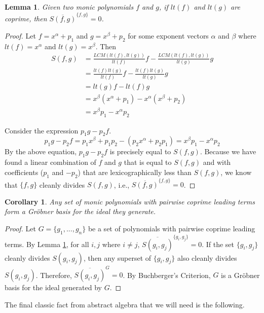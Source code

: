 \documentclass{msthesis}
\newtheorem{lemma}[theorem]{Lemma}
\newtheorem{corollary}[theorem]{Corollary}
\theoremstyle{definition}
\begin{document}
\begin{lemma}\label{lemma:monicS}
    Given two monic polynomials $f$ and $g$, if $lt(f)$ and $lt(g)$ are coprime, then $\overline{S(f,g)}^{\{f,g\}} = 0$.
\end{lemma}
\begin{proof}
    Let $f = x^\alpha + p_1$ and $g = x^\beta + p_2$ for some exponent vectors $\alpha$ and $\beta$ where $lt(f) = x^\alpha$ and $lt(g) = x^\beta$. Then
     \begin{align*}
         S(f,g) &= \frac{LCM(lt(f), lt(g))}{lt(f)}f - \frac{LCM(lt(f), lt(g))}{lt(g)}g\\
         &= \frac{lt(f)lt(g)}{lt(f)}f - \frac{lt(f)lt(g)}{lt(g)}g \\
         &= lt(g)f - lt(f)g \\
         &= x^\beta (x^\alpha + p_1) - x^\alpha (x^\beta + p_2) \\
         &= x^\beta p_1 - x^\alpha p_2
     \end{align*}

     Consider the expression $p_1g - p_2f$.
     \[ p_1g - p_2f = p_1x^\beta + p_1p_2 - (p_2x^\alpha + p_2p_1) = x^\beta p_1 - x^\alpha p_2 \]
     By the above equation, $p_1g - p_2f$ is precisely equal to $S(f, g)$.  Because we have found a linear combination of $f$ and $g$ that is equal to $S(f, g)$ and with coefficients ($p_1$ and $-p_2$) that are lexicographically less than $S(f, g)$, we know that $\{f, g\}$ cleanly divides $S(f, g)$, i.e., $\overline{S(f,g)}^{\{f,g\}} = 0$. 
\end{proof}

\begin{corollary}\label{cor:coprimeGB}
    Any set of monic polynomials with pairwise coprime leading terms form a Gr\"obner basis for the ideal they generate.
\end{corollary}
\begin{proof}
    Let $G=\{g_1, ..., g_n\}$ be a set of polynomials with pairwise coprime leading terms.  By Lemma \ref{lemma:monicS}, for all $i, j$ where $i \neq j$, $\overline{S(g_i,g_j)}^{\{g_i,g_j\}} = 0$.  If the set $\{g_i, g_j\}$ cleanly divides $S(g_i,g_j)$, then any superset of $\{g_i, g_j\}$ also cleanly divides $S(g_i,g_j)$.  Therefore, $\overline{S(g_i,g_j)}^{G} = 0$.  By Buchberger's Criterion, $G$ is a Gr\"obner basis for the ideal generated by $G$.
\end{proof}

The final classic fact from abstract algebra that we will need is the following.
\end{document}
